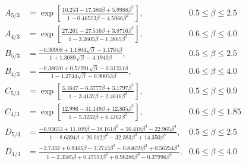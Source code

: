 \documentclass[twocolumn]{emulateapj}
\begin{document}
\begin{align}
A_{5/3} &= \exp\left[\frac{10.253-17.380 \beta +5.9988 \beta ^2}{1-0.46573 \beta -4.5066 \beta ^2}\right],&0.5 \leq \beta \leq 2.5\\
A_{4/3} &= \exp\left[\frac{27.261-27.516 \beta +3.8716 \beta ^2}{1-3.2605 \beta -1.3865 \beta ^2}\right],&0.6 \leq \beta \leq 4.0\\
B_{5/3} &= \frac{-0.30908+1.1804 \sqrt{\beta }-1.1764 \beta }{1+1.3089 \sqrt{\beta }-4.1940 \beta },&0.5 \leq \beta \leq 2.5\\
B_{4/3} &= \frac{-0.38670+0.57291 \sqrt{\beta }-0.31231 \beta }{1-1.2744 \sqrt{\beta }-0.90053 \beta },&0.6 \leq \beta \leq 4.0\\
C_{5/3} &= \exp\left[\frac{3.1647-6.3777\beta+3.1797\beta^2}{1-3.4137\beta+2.4616\beta^2}\right],&0.5 \leq \beta \leq 0.9\\
C_{4/3} &= \exp\left[\frac{12.996-31.149 \beta +12.865 \beta ^2}{1-5.3232 \beta +6.4262 \beta ^2}\right],&0.6 \leq \beta \leq 1.85\\
D_{5/3} &= \frac{-0.93653+11.109 \beta -38.161 \beta ^2+50.418 \beta ^3-22.965 \beta ^4}{1-8.6394 \beta +26.012 \beta ^2-32.383 \beta ^3+14.350 \beta ^4},&0.5 \leq \beta \leq 2.5\\
D_{4/3} &= \frac{-2.7332+6.9465 \beta -3.2743 \beta ^2-0.84659 \beta ^3+0.56254 \beta ^4}{1-2.3585 \beta +0.47593 \beta ^2+0.96280 \beta ^3-0.37996 \beta ^4}.&0.6 \leq \beta \leq 4.0
\end{align}



\end{document}
